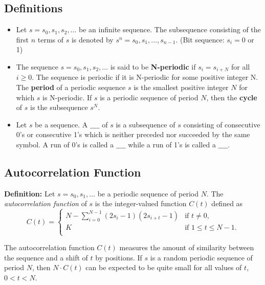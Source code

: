 \documentclass[12pt,openany]{book}
\theoremstyle{definition}
\begin{document}
	\subsection*{Definitions}
	\begin{itemize}
		\item Let \( s = s_0, s_1, s_2, \ldots \) be an infinite sequence. The subsequence consisting of the first \( n \) terms of \( s \) is denoted by \( s^n = s_0, s_1, \ldots, s_{n-1} \). (Bit sequence: \( s_i = 0 \) or 1)
		\item The sequence \( s = s_0, s_1, s_2, \ldots \) is said to be \textbf{N-periodic} if \( s_i = s_{i+N} \) for all \( i \geq 0 \). The sequence is periodic if it is N-periodic for some positive integer N. The \textbf{period} of a periodic sequence \( s \) is the smallest positive integer \( N \) for which \( s \) is N-periodic. If \( s \) is a periodic sequence of period \( N \), then the \textbf{cycle} of \( s \) is the subsequence \( s^N \).
		\item Let \( s \) be a sequence. A \(\_\_\_\_\) of \( s \) is a subsequence of \( s \) consisting of consecutive 0’s or consecutive 1’s which is neither preceded nor succeeded by the same symbol. A run of 0’s is called a \(\_\_\_\_\) while a run of 1’s is called a \(\_\_\_\_\).
	\end{itemize}
	
	\subsection*{Autocorrelation Function}
	\textbf{Definition:} Let \( s = s_0, s_1, \ldots \) be a periodic sequence of period \( N \). The \textit{autocorrelation function} of \( s \) is the integer-valued function \( C(t) \) defined as
	\[ C(t) = \begin{cases} 
		N - \sum_{i=0}^{N-1} (2s_i - 1)(2s_{i+t} - 1) & \text{if } t \neq 0, \\
		K & \text{if } 1 \leq t \leq N - 1. \\
	\end{cases} \]
	
	The autocorrelation function \( C(t) \) measures the amount of similarity between the sequence and a shift of \( t \) by positions. If \( s \) is a random periodic sequence of period \( N \), then \( N \cdot C(t) \) can be expected to be quite small for all values of \( t \), \( 0 < t < N \).
	
\end{document}
